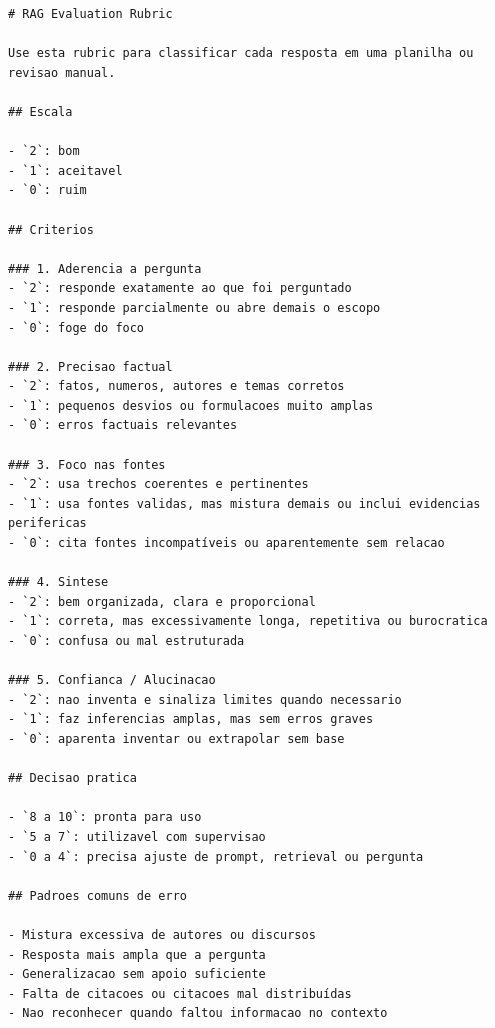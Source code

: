 \begin{Verbatim}[breaklines=true]
# RAG Evaluation Rubric

Use esta rubric para classificar cada resposta em uma planilha ou revisao manual.

## Escala

- `2`: bom
- `1`: aceitavel
- `0`: ruim

## Criterios

### 1. Aderencia a pergunta
- `2`: responde exatamente ao que foi perguntado
- `1`: responde parcialmente ou abre demais o escopo
- `0`: foge do foco

### 2. Precisao factual
- `2`: fatos, numeros, autores e temas corretos
- `1`: pequenos desvios ou formulacoes muito amplas
- `0`: erros factuais relevantes

### 3. Foco nas fontes
- `2`: usa trechos coerentes e pertinentes
- `1`: usa fontes validas, mas mistura demais ou inclui evidencias perifericas
- `0`: cita fontes incompatíveis ou aparentemente sem relacao

### 4. Sintese
- `2`: bem organizada, clara e proporcional
- `1`: correta, mas excessivamente longa, repetitiva ou burocratica
- `0`: confusa ou mal estruturada

### 5. Confianca / Alucinacao
- `2`: nao inventa e sinaliza limites quando necessario
- `1`: faz inferencias amplas, mas sem erros graves
- `0`: aparenta inventar ou extrapolar sem base

## Decisao pratica

- `8 a 10`: pronta para uso
- `5 a 7`: utilizavel com supervisao
- `0 a 4`: precisa ajuste de prompt, retrieval ou pergunta

## Padroes comuns de erro

- Mistura excessiva de autores ou discursos
- Resposta mais ampla que a pergunta
- Generalizacao sem apoio suficiente
- Falta de citacoes ou citacoes mal distribuídas
- Nao reconhecer quando faltou informacao no contexto
\end{Verbatim}

